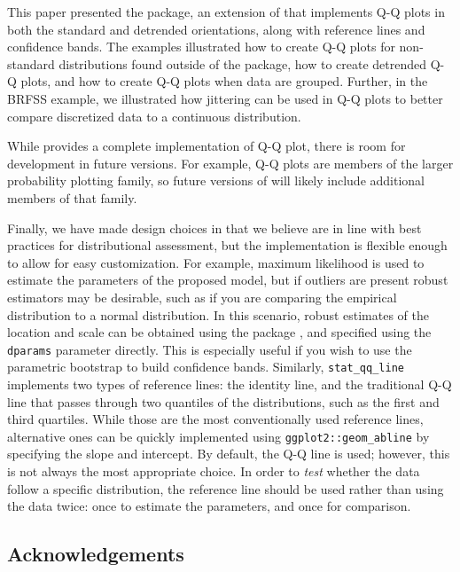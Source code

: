 This paper presented the  package, an extension of
 that implements Q-Q plots in both the standard and
detrended orientations, along with reference lines and confidence bands.
The examples illustrated how to create Q-Q plots for non-standard
distributions found outside of the  package, how to create
detrended Q-Q plots, and how to create Q-Q plots when data are grouped.
Further, in the BRFSS example, we illustrated how jittering can be used
in Q-Q plots to better compare discretized data to a continuous
distribution.

While  provides a complete implementation of Q-Q plot,
there is room for development in future versions. For example, Q-Q plots
are members of the larger probability plotting family, so future
versions of  will likely include additional members of that
family.

Finally, we have made design choices in  that we believe
are in line with best practices for distributional assessment, but the
implementation is flexible enough to allow for easy customization. For
example, maximum likelihood is used to estimate the parameters of the
proposed model, but if outliers are present robust estimators may be
desirable, such as if you are comparing the empirical distribution to a
normal distribution. In this scenario, robust estimates of the location
and scale can be obtained using the  package
\citep{robustbase}, and specified using the \texttt{dparams} parameter
directly. This is especially useful if you wish to use the parametric
bootstrap to build confidence bands. Similarly, \texttt{stat\_qq\_line}
implements two types of reference lines: the identity line, and the
traditional Q-Q line that passes through two quantiles of the
distributions, such as the first and third quartiles. While those are
the most conventionally used reference lines, alternative ones can be
quickly implemented using \texttt{ggplot2::geom\_abline} by specifying
the slope and intercept. By default, the Q-Q line is used; however, this
is not always the most appropriate choice. In order to \emph{test}
whether the data follow a specific distribution, the reference line
should be used rather than using the data twice: once to estimate the
parameters, and once for comparison.



\hypertarget{acknowledgements}{%
\subsection{Acknowledgements}\label{acknowledgements}}

